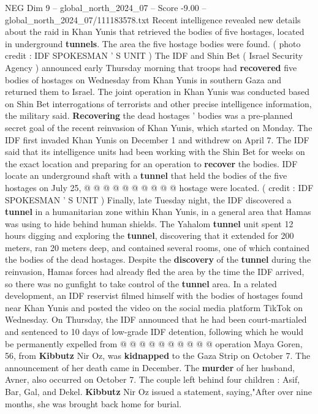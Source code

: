 \begin{textsample}{NEG Dim 9 – global\_north\_2024\_07 – Score -9.00 – global\_north\_2024\_07/111183578.txt}  \label{ex:f9_neg_152}
Recent intelligence revealed new details about the raid in Khan Yunis that retrieved the bodies of five hostages, located in underground \textbf{tunnels}.
The area the five hostage bodies were found. ( photo credit : IDF SPOKESMAN ' S UNIT ) The IDF and Shin Bet ( Israel Security Agency ) announced early Thursday morning that troops had \textbf{recovered} five bodies of hostages on Wednesday from Khan Yunis in southern Gaza and returned them to Israel.
The joint operation in Khan Yunis was conducted based on Shin Bet interrogations of terrorists and other precise intelligence information, the military said. \textbf{Recovering} the dead hostages ' bodies was a pre-planned secret goal of the recent reinvasion of Khan Yunis, which started on Monday.
The IDF first invaded Khan Yunis on December 1 and withdrew on April 7.
The IDF said that its intelligence units had been working with the Shin Bet for weeks on the exact location and preparing for an operation to \textbf{recover} the bodies.
IDF locate an underground shaft with a \textbf{tunnel} that held the bodies of the five hostages on July 25, @ @ @ @ @ @ @ @ @ @ hostage were located. ( credit : IDF SPOKESMAN ' S UNIT ) Finally, late Tuesday night, the IDF discovered a \textbf{tunnel} in a humanitarian zone within Khan Yunis, in a general area that Hamas was using to hide behind human shields.
The Yahalom \textbf{tunnel} unit spent 12 hours digging and exploring the \textbf{tunnel}, discovering that it extended for 200 meters, ran 20 meters deep, and contained several rooms, one of which contained the bodies of the dead hostages.
Despite the \textbf{discovery} of the \textbf{tunnel} during the reinvasion, Hamas forces had already fled the area by the time the IDF arrived, so there was no gunfight to take control of the \textbf{tunnel} area.
In a related development, an IDF reservist filmed himself with the bodies of hostages found near Khan Yunis and posted the video on the social media platform TikTok on Wednesday.
On Thursday, the IDF announced that he had been court-martialed and sentenced to 10 days of low-grade IDF detention, following which he would be permanently expelled from @ @ @ @ @ @ @ @ @ @ operation Maya Goren, 56, from \textbf{Kibbutz} Nir Oz, was \textbf{kidnapped} to the Gaza Strip on October 7.
The announcement of her death came in December.
The \textbf{murder} of her husband, Avner, also occurred on October 7.
The couple left behind four children : Asif, Bar, Gal, and Dekel. \textbf{Kibbutz} Nir Oz issued a statement, saying,"After over nine months, she was brought back home for burial.

\end{textsample}
